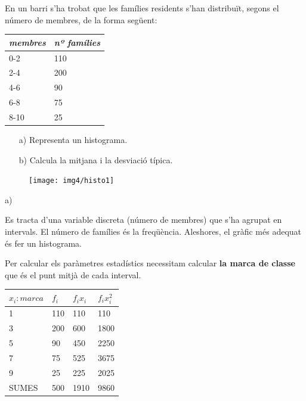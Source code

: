 	
	\begin{resolt}{En un barri s'ha trobat que les famílies residents s'han distribuït, segons el número de membres, de la forma següent:\vspace{0.25cm}
			
			\begin{tabular}{|p{0.7in}|p{0.8in}|} \hline 
				\textbf{\textit{membres}} & \textbf{\textit{nº famílies}} \\ \hline 
				0-2 & 110 \\ \hline 
				2-4 & 200 \\ \hline 
				4-6 & 90 \\ \hline 
				6-8 & 75 \\ \hline 
				8-10 & 25 \\ \hline 
			\end{tabular}
			\vspace{0.25cm}
			
			\begin{itemize}
				\item[a)]  Representa un histograma.
				
				\item[b)]  Calcula la mitjana i la desviació típica.
			\end{itemize}
		}
		
		\begin{figure} 
			\vspace{-0.75cm}
			\begin{center}
				\texttt{[image: img4/histo1]}
			\end{center}
			\vspace{-0.5cm}
		\end{figure}
		
		a)
		\vspace{0.24cm}
		
		Es tracta d'una variable discreta (número de membres) que s'ha agrupat en intervals. El número de famílies és la freqüència. Aleshores, el gràfic més adequat és fer un histograma.
		\vspace{0.24cm}
		
		Per calcular els paràmetres estadístics necessitam calcular \textbf{la marca de classe} que és el punt mitjà de cada interval.
		\begin{center}
			\begin{tabular}{|p{0.7in}|p{0.8in}|p{0.8in}|p{0.8in}|} \hline 
				$x_i: marca$ & $f_i$ & $f_i x_i$ & $f_i x_i^2$\\ \hline 
				1 & 110 & 110 & 110 \\ \hline 
				3 & 200 & 600 & 1800 \\ \hline 
				5 & 90 & 450 & 2250\\ \hline 
				7 & 75 & 525 & 3675 \\ \hline 
				9 & 25 & 225 & 2025 \\ \hline\hline
				\rowcolor{lightgray} SUMES & 500 & 1910 & 9860\\ \hline 
			\end{tabular}
		\end{center}	\vspace{0.24cm}
		

\end{resolt}
